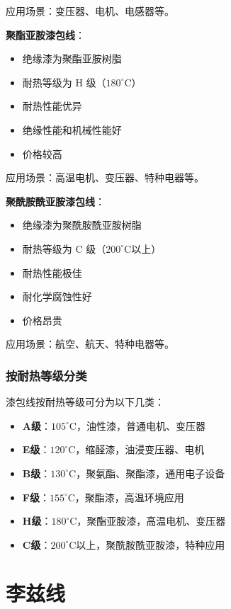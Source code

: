 \documentclass[12pt,UTF8]{ctexbook}
\begin{document}
应用场景：变压器、电机、电感器等。

\textbf{聚酯亚胺漆包线}：
\begin{itemize}[leftmargin=3.5em]
    \item 绝缘漆为聚酯亚胺树脂
    \item 耐热等级为 H 级（$180^\circ$C）
    \item 耐热性能优异
    \item 绝缘性能和机械性能好
    \item 价格较高
\end{itemize}

应用场景：高温电机、变压器、特种电器等。

\textbf{聚酰胺酰亚胺漆包线}：
\begin{itemize}[leftmargin=3.5em]
    \item 绝缘漆为聚酰胺酰亚胺树脂
    \item 耐热等级为 C 级（$200^\circ$C以上）
    \item 耐热性能极佳
    \item 耐化学腐蚀性好
    \item 价格昂贵
\end{itemize}

应用场景：航空、航天、特种电器等。

\subsubsection{按耐热等级分类}

漆包线按耐热等级可分为以下几类：

\begin{itemize}[leftmargin=3.5em]
    \item \textbf{A级}：$105^\circ$C，油性漆，普通电机、变压器
    \item \textbf{E级}：$120^\circ$C，缩醛漆，油浸变压器、电机
    \item \textbf{B级}：$130^\circ$C，聚氨酯、聚酯漆，通用电子设备
    \item \textbf{F级}：$155^\circ$C，聚酯漆，高温环境应用
    \item \textbf{H级}：$180^\circ$C，聚酯亚胺漆，高温电机、变压器
    \item \textbf{C级}：$200^\circ$C以上，聚酰胺酰亚胺漆，特种应用
\end{itemize}

\section{李兹线}
\end{document}
